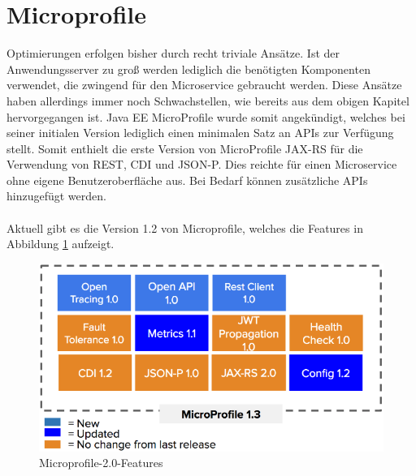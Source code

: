 \section{Microprofile}
Optimierungen erfolgen bisher durch recht triviale Ansätze. Ist der Anwendungsserver zu groß werden lediglich die benötigten Komponenten verwendet, die zwingend für den Microservice gebraucht werden. Diese Ansätze haben allerdings immer noch Schwachstellen, wie bereits aus dem obigen Kapitel hervorgegangen ist. Java EE MicroProfile wurde somit angekündigt, welches bei seiner initialen Version lediglich einen minimalen Satz an APIs zur Verfügung stellt. Somit enthielt die erste Version von MicroProfile JAX-RS für die Verwendung von REST, CDI und JSON-P. Dies reichte für einen Microservice ohne eigene Benutzeroberfläche aus. Bei Bedarf können zusätzliche APIs hinzugefügt werden. \\ \\

Aktuell gibt es die Version 1.2 von Microprofile, welches die Features in Abbildung \ref{fig:features} aufzeigt.

\begin{figure}[h!]
	\centering
	\includegraphics[width=1.0\linewidth]{images/Microprofile13}
	\caption{Microprofile-2.0-Features \cite{Microprofile.2017}} %
	\label{fig:features}
\end{figure}

